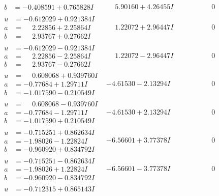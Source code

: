 \documentclass[1p]{elsarticle_modified}
\theoremstyle{definition}
\begin{document}
$$\begin{array}{c|c|c}
\begin{aligned}
b &= -0.408591 + 0.765828 I\end{aligned}
 & \phantom{-}5.90160 + 4.26455 I & \phantom{-0.000000 } 0 \\ \hline\begin{aligned}
u &= -0.612029 + 0.921384 I \\
a &= \phantom{-}2.22856 + 2.25864 I \\
b &= \phantom{-}2.93767 + 0.27662 I\end{aligned}
 & \phantom{-}1.22072 + 2.96447 I & \phantom{-0.000000 } 0 \\ \hline\begin{aligned}
u &= -0.612029 - 0.921384 I \\
a &= \phantom{-}2.22856 - 2.25864 I \\
b &= \phantom{-}2.93767 - 0.27662 I\end{aligned}
 & \phantom{-}1.22072 - 2.96447 I & \phantom{-0.000000 } 0 \\ \hline\begin{aligned}
u &= \phantom{-}0.608068 + 0.939760 I \\
a &= -0.77684 + 1.29711 I \\
b &= -1.017590 - 0.210549 I\end{aligned}
 & -4.61530 - 2.13294 I & \phantom{-0.000000 } 0 \\ \hline\begin{aligned}
u &= \phantom{-}0.608068 - 0.939760 I \\
a &= -0.77684 - 1.29711 I \\
b &= -1.017590 + 0.210549 I\end{aligned}
 & -4.61530 + 2.13294 I & \phantom{-0.000000 } 0 \\ \hline\begin{aligned}
u &= -0.715251 + 0.862634 I \\
a &= -1.98026 - 1.22824 I \\
b &= -0.960920 + 0.834792 I\end{aligned}
 & -6.56601 + 3.77378 I & \phantom{-0.000000 } 0 \\ \hline\begin{aligned}
u &= -0.715251 - 0.862634 I \\
a &= -1.98026 + 1.22824 I \\
b &= -0.960920 - 0.834792 I\end{aligned}
 & -6.56601 - 3.77378 I & \phantom{-0.000000 } 0 \\ \hline\begin{aligned}
u &= -0.712315 + 0.865143 I \\

\end{aligned}
\end{array}$$
\end{document}
